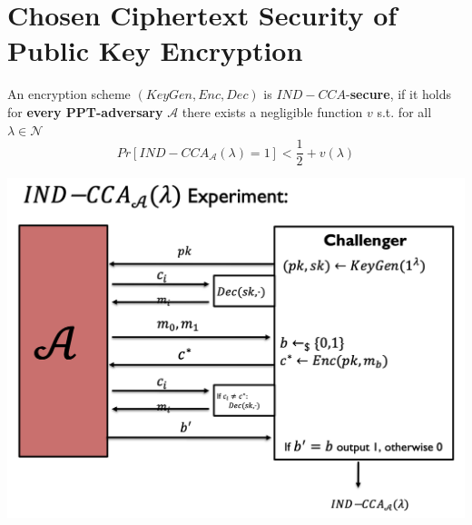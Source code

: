     \section{Chosen Ciphertext Security of Public Key Encryption}
        \begin{definition}
            An encryption scheme $(KeyGen,Enc,Dec)$ is $IND-CCA$-\textbf{secure}, if it holds for \textbf{every PPT-adversary} $\mathcal{A}$ there exists a negligible function $v$ s.t. for all $\lambda \in \mathcal{N}$
            $$Pr[IND-CCA_{\mathcal{A}}(\lambda)=1] < \frac{1}{2} + v(\lambda)$$
        \end{definition}
        \begin{center}
	        \includegraphics[width=180mm]{Graphics/Chosen Ciphertext Secure Public Key Encryption/cca5.png}
        \end{center}

\newpage
